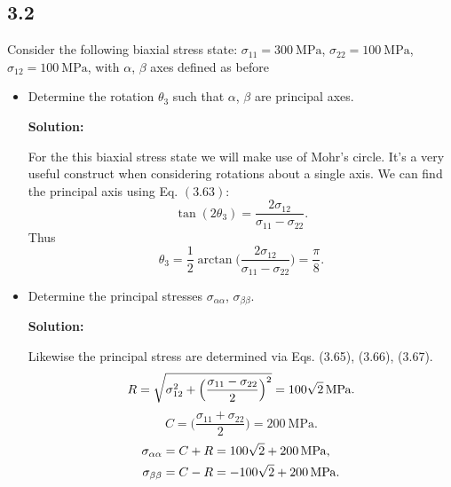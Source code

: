 \documentclass[12pt]{article}
\begin{document}
\subsection{3.2}
Consider the following biaxial stress state: $\sigma_{11} = \SI{300}{\mega\pascal}$,
$\sigma_{22} = \SI{100}{\mega\pascal}$, $\sigma_{12} = \SI{100}{\mega\pascal}$,
with $\alpha$, $\beta$ axes defined as before
\begin{itemize}
	\item Determine the rotation $\theta_3$ such that $\alpha$, $\beta$ are principal axes.

	      \textbf{Solution:}

	      For the this biaxial stress state we will make use of Mohr’s circle. It’s a very useful construct when
	      considering rotations about a single axis. We can find the principal axis using Eq. $(3.63)$:
	      \begin{equation}
		      \tan(2\theta_3) = \frac{2 \sigma_{12}}{\sigma_{11} - \sigma_{22}}.
	      \end{equation}
	      Thus
	      \begin{equation}
		      \theta_3 = \frac{1}{2} \arctan \Big( \frac{2 \sigma_{12}}{\sigma_{11} - \sigma_{22}} \Big) = \frac{\pi}{8}.
	      \end{equation}

	\item Determine the principal stresses $\sigma_{\alpha\alpha}$, $\sigma_{\beta\beta}$.

	      \textbf{Solution:}

	      Likewise the principal stress are determined via Eqs. (3.65), (3.66), (3.67).
	      \begin{equation}
		      R = \sqrt{\sigma_{12}^2 + \Big( \frac{\sigma_{11} - \sigma_{22}}{2} \Big)^2} = \SI[parse-numbers = false, number-math-rm = \ensuremath]{100 \sqrt{2}}{\mega\pascal}.
	      \end{equation}
	      \begin{equation}
		      C = \bigg( \frac{\sigma_{11} + \sigma_{22}}{2} \bigg) = \SI{200}{\mega\pascal}.
	      \end{equation}
	      \begin{align}
		      \sigma_{\alpha\alpha} & = C + R = \SI[parse-numbers = false, number-math-rm = \ensuremath]{100 \sqrt{2} + 200}{\mega\pascal},  \\
		      \sigma_{\beta\beta}   & = C - R = \SI[parse-numbers = false, number-math-rm = \ensuremath]{-100 \sqrt{2} + 200}{\mega\pascal}.
	      \end{align}


\end{itemize}
\end{document}
